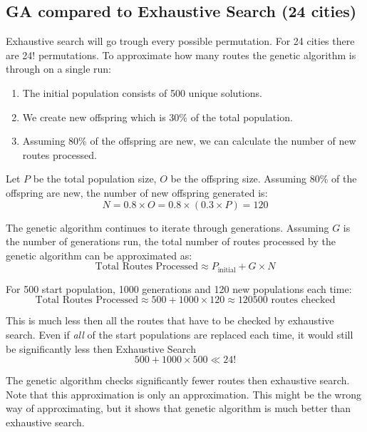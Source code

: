 \documentclass{article}
\begin{document}
    \newpage

    \subsection{GA compared to Exhaustive Search (24 cities)}

    Exhaustive search will go trough every possible permutation. For 24 cities there are 24! permutations. 
    To approximate how many routes the genetic algorithm is through on a single run:

    \begin{enumerate}
        \item The initial population consists of 500 unique solutions.
        \item We create new offspring which is 30\% of the total population.
        \item Assuming 80\% of the offspring are new, we can calculate the number of new routes processed.
    \end{enumerate}

    Let \(P\) be the total population size, \(O\) be the offspring size.
    Assuming 80\% of the offspring are new, the number of new offspring generated is:
    \[
    N = 0.8 \times O = 0.8 \times (0.3 \times P) = 120
    \]

    The genetic algorithm continues to iterate through generations. Assuming \(G\) is the number of generations run, the total number of routes processed by the genetic algorithm can be approximated as:
    \[
    \text{Total Routes Processed} \approx P_{\text{initial}} + G \times N
    \]

    For 500 start population, 1000 generations and 120 new populations each time: 
    \[
    \text{Total Routes Processed} \approx 500 + 1000 \times 120 \approx 120500 \text{ routes checked}
    \]

    This is much less then all the routes that have to be checked by exhaustive search.
    Even if \textit{all} of the start populations are replaced each time, it would still be significantly less then Exhaustive Search
    \[
    500 + 1000 \times 500 \ll 24!
    \]

    The genetic algorithm checks significantly fewer routes then exhaustive search. Note that this approximation is only an approximation. 
    This might be the wrong way of approximating, but it shows that genetic algorithm is much better than exhaustive search. 
\end{document}
